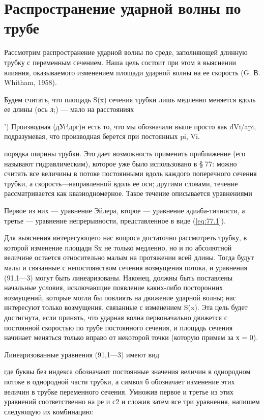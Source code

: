 \section{Распространение ударной волны по трубе}\label{sec:p91}

Рассмотрим распространение ударной волны по среде, заполняющей длинную трубку с
переменным сечением. Наша цель состоит при этом в выяснении влияния,
оказываемого изменением площади ударной волны на ее скорость (G. В. Whitham,
1958).

Будем считать, что площадь S(x) сечения трубки лишь медленно меняется вдоль ее
длины (ось л;) — мало на расстояниях

') Производная (дУг!дрг)н есть то, что мы обозначали выше просто как dVi/api,
подразумевая, что производная берется при постоянных pi, Vi.


порядка ширины трубки. Это дает возможность применить приближение (его называют
гидравлическим), которое уже было использовано в § 77: можно считать все
величины в потоке постоянными вдоль каждого поперечного сечения трубки, а
скорость—направленной вдоль ее оси; другими словами, течение рассматривается
как квазиодномерное. Такое течение описывается уравнениями

Первое из них — уравнение Эйлера, второе — уравнение адиаба-тичности, а третье
— уравнение непрерывности, представленное в виде (\ref{eq:77.1}).

Для выяснения интересующего нас вопроса достаточно рассмотреть трубку, в
которой изменение площади Sx не только медленно, но и по абсолютной величине
остается относительно малым на протяжении всей длины. Тогда будут малы и
связанные с непостоянством сечения возмущения потока, и уравнения (91,1—3)
могут быть линеаризованы. Наконец, должны быть поставлены начальные условия,
исключающие появление каких-либо посторонних возмущений, которые могли бы
повлиять на движение ударной волны; нас интересуют только возмущения, связанные
с изменением S(x). Эта цель будет достигнута, если принять, что ударная волна
первоначально движется с постоянной скоростью по трубе постоянного сечения, и
площадь сечения начинает меняться только вправо от некоторой точки (которую
примем за х = 0).

Линеаризованные уравнения (91,1—3) имеют вид



где буквы без индекса обозначают постоянные значения величин в однородном
потоке в однородной части трубки, а символ б обозначает изменение этих величин
в трубке переменного сечения. Умножив первое и третье из этих уравнений
соответственно на ре и с2 и сложив затем все три уравнения, напишем следующую
их комбинацию:


